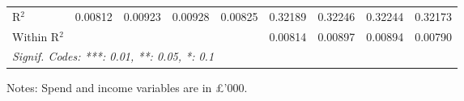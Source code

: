 \begin{table}[htbp]
\begin{threeparttable}[b]
\begin{tabular}{lcccccccc}
         R$^2$                    & 0.00812         & 0.00923         & 0.00928         & 0.00825         & 0.32189         & 0.32246         & 0.32244         & 0.32173\\  
         Within R$^2$             &                 &                 &                 &                 & 0.00814         & 0.00897         & 0.00894         & 0.00790\\  
         \midrule \midrule
         \multicolumn{9}{l}{\emph{Signif. Codes: ***: 0.01, **: 0.05, *: 0.1}}\\
      \end{tabular}
      
      \begin{tablenotes}\footnotesize
         \item Notes: Spend and income variables are in \pounds'000.
      \end{tablenotes}
   \end{threeparttable}
\end{table}


